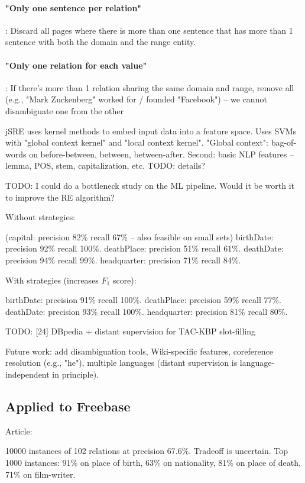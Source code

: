 \paragraph{"Only one sentence per relation"}: Discard all pages where there is
more than one sentence that has more than 1 sentence with both the domain and
the range entity.

\paragraph{"Only one relation for each value"}: If there's more than 1 relation
sharing the same domain and range, remove all (e.g., "Mark Zuckenberg" worked
for / founded "Facebook") -- we cannot disambiguate one from the other

jSRE uses kernel methods to embed input data into a feature space. Uses SVMs
with "global context kernel" and "local context kernel". "Global context":
bag-of-words on before-between, between, between-after. Second: basic NLP
features -- lemma, POS, stem, capitalization, etc.
TODO: details?

TODO: I could do a bottleneck study on the ML pipeline. Would it be worth it to
improve the RE algorithm?

Without strategies:

(capital: precision 82\% recall 67\% -- also feasible on small sets)
birthDate: precision 92\% recall 100\%.
deathPlace: precision 51\% recall 61\%.
deathDate: precision 94\% recall 99\%.
headquarter: precision 71\% recall 84\%.

With strategies (increases $F_1$ score):

birthDate: precision 91\% recall 100\%.
deathPlace: precision 59\% recall 77\%.
deathDate: precision 93\% recall 100\%.
headquarter: precision 81\% recall 80\%.

TODO: [24] DBpedia + distant supervision for TAC-KBP slot-filling

Future work: add disambiguation tools, Wiki-specific features, coreference
resolution (e.g., "he"), multiple languages (distant supervision is
language-independent in principle).

\subsection{Applied to Freebase}

Article: \cite{distant-supervision}

10000 instances of 102 relations at precision 67.6\%. Tradeoff is uncertain.
Top 1000 instances: 91\% on place of birth, 63\% on nationality, 81\% on place
of death, 71\% on film-writer.

